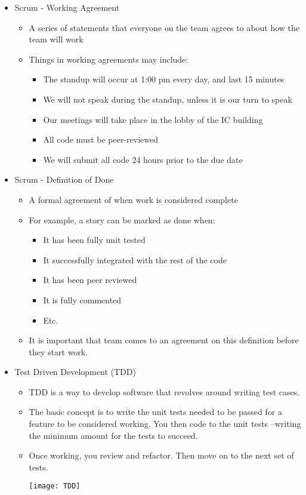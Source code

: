 \begin{itemize}
	\item Scrum - Working Agreement
	\begin{itemize}
		\item A series of statements that everyone on the team agrees to about how the team will work
		\item Things in working agreements may include:
		\begin{itemize}
			\item The standup will occur at 1:00 pm every day, and last 15 minutes
			\item We will not speak during the standup, unless it is our turn to speak
			\item Our meetings will take place in the lobby of the IC building
			\item All code must be peer-reviewed
			\item We will submit all code 24 hours prior to the due date
		\end{itemize}
	\end{itemize}

	\item Scrum - Definition of Done
	\begin{itemize}
		\item A formal agreement of when work is considered complete
		\item For example, a story can be marked as done when:
		\begin{itemize}
			\item It has been fully unit tested
			\item It successfully integrated with the rest of the code
			\item It has been peer reviewed
			\item It is fully commented
			\item Etc.
		\end{itemize}
		\item It is important that team comes to an agreement on this definition before they start work.
	\end{itemize}

	\item Test Driven Development (TDD)
	\begin{itemize}
		\item TDD is a way to develop software that revolves around writing test cases.
		\item The basic concept is to write the unit tests needed to be passed for a feature to be considered working. You then code to the unit tests –writing the minimum amount for the tests to succeed.
		\item Once working, you review and refactor. Then move on to the next set of tests.\\[-15pt]
		\begin{center}
			\texttt{[image: TDD]}
		\end{center}
	\end{itemize}


\end{itemize}
